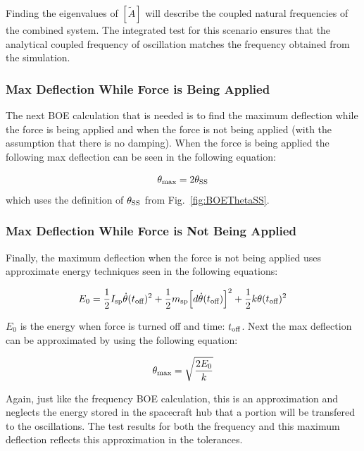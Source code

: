 Finding the eigenvalues of $[\tilde{A}]$ will describe the coupled natural frequencies of the combined system. The integrated test for this scenario ensures that the analytical coupled frequency of oscillation matches the frequency obtained from the simulation. 

\subsubsection{Max Deflection While Force is Being Applied}

The next BOE calculation that is needed is to find the maximum deflection while the force is being applied and when the force is not being applied (with the assumption that there is no damping). When the force is being applied the following max deflection can be seen in the following equation:

\begin{equation}
\theta_{\textnormal{max}} = 2 \theta_{\textnormal{SS}}
\end{equation}
which uses the definition of $\theta_{\textnormal{SS}}$ from Fig.~\ref{fig:BOEThetaSS}. 

\subsubsection{Max Deflection While Force is Not Being Applied}

Finally, the maximum deflection when the force is not being applied uses approximate energy techniques seen in the following equations:

\begin{equation}
E_0 = \frac{1}{2} I_{\textnormal{sp}} \dot{\theta}(t_{\textnormal{off}})^2 + \frac{1}{2} m_{\textnormal{sp}} \Big[d \dot{\theta}(t_{\textnormal{off}})\Big]^2 + \frac{1}{2} k \theta(t_{\textnormal{off}})^2
\end{equation}

$E_0$ is the energy when force is turned off and time: $t_{\textnormal{off}}$. Next the max deflection can be approximated by using the following equation: 

\begin{equation}
\theta_{\textnormal{max}} = \sqrt{\frac{2 E_0}{k}}
\end{equation}

Again, just like the frequency BOE calculation, this is an approximation and neglects the energy stored in the spacecraft hub that a portion will be transfered to the oscillations. The test results for both the frequency and this maximum deflection reflects this approximation in the tolerances. 

